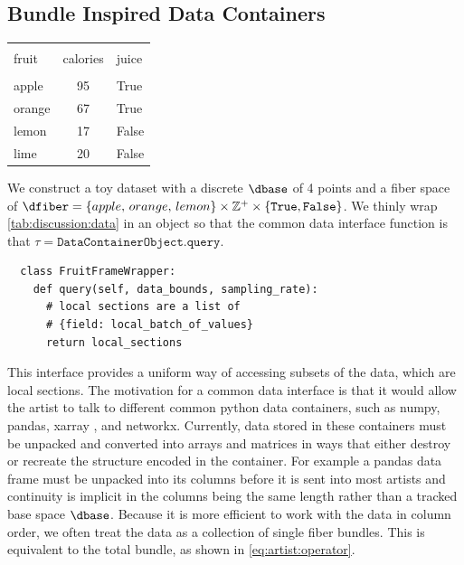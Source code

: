 \documentclass[10pt,journal,compsoc]{IEEEtran}
\theoremstyle{definition}
\theoremstyle{remark}
\begin{document}
\subsection{Bundle Inspired Data Containers}
\begin{table}[h!]
  \centering
\begin{tabular}{|lcl|}
  \hline \\
   fruit &  calories &  juice \\
  \hline\\
    apple &        95 &   True \\ 
   orange &        67 &   True \\ 
  lemon &        17 &  False \\ 
      lime &        20 &  False \\
  \hline
\end{tabular}
\label{tab:discussion:data}
\end{table}
We construct a toy dataset with a discrete $\dbase$ of 4 points and a fiber space of $\dfiber=\{apple,\, orange,\, lemon\}\times \mathbb{Z}^{+} \times \{\texttt{True}, \texttt{False}\}$. We thinly wrap \autoref{tab:discussion:data} in an object so that the common data interface function is that $\tau = \texttt{DataContainerObject.query}$. 
\begin{verbatim}
  class FruitFrameWrapper:
    def query(self, data_bounds, sampling_rate):
      # local sections are a list of
      # {field: local_batch_of_values}
      return local_sections
\end{verbatim}

This interface provides a uniform way of accessing subsets of the data, which are local sections. The motivation for a common data interface is that it would allow the artist to talk to different common python data containers, such as numpy\cite{harris2020array}, pandas\cite{jeff_reback_2020_3715232}, xarray \cite{hoyer2017xarray}, and networkx\cite{HagbergExploringNetwork2008}. Currently, data stored in these containers must be unpacked and converted into arrays and matrices in ways that either destroy or recreate the structure encoded in the container. For example a pandas data frame must be unpacked into its columns before it is sent into most artists and continuity is implicit in the columns being the same length rather than a tracked base space $\dbase$. Because it is more efficient to work with the data in column order, we often treat the data as a collection of single fiber bundles. This is equivalent to the total bundle, as shown in \autoref{eq:artist:operator}. 
\end{document}
